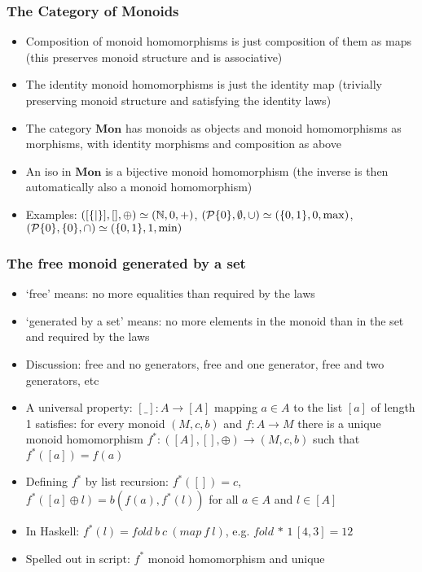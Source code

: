 \documentclass[handout]{beamer}
\newcommand{\bfsf}[1]{{\boldsymbol{#1}}}
\newcommand{\Mon}{\bfsf{Mon}}
\begin{document}
\frame
  {   
    \frametitle{The Category of Monoids}\label{Ch2:CatMon}

 \begin{itemize}[<+->]
\item Composition of monoid homomorphisms is just composition of them as maps
(this preserves monoid structure and is associative)
\item The identity monoid homomorphisms is just the identity map 
(trivially preserving monoid structure and satisfying the identity laws)
\item The category $\Mon$ has monoids as objects and monoid homomorphisms
 as morphisms, with identity morphisms and composition as above
\item An iso in $\Mon$ is a bijective monoid  homomorphism (the inverse
is then automatically also a monoid  homomorphism) 
\item Examples: $([\{|\}],[],\oplus) \simeq (\mathbb{N},0,{+})$, 
$({\operatorname{\mathcal{P}}}{\{0\}},\emptyset,{\cup}) \simeq (\{0,1\},0,{\max})$,
$({\operatorname{\mathcal{P}}}{\{0\}},\{0\},{\cap}) \simeq (\{0,1\},1,{\min})$

 \end{itemize}

 }

\frame
  {   
    \frametitle{The free monoid generated by a set }\label{Ch2:freemonoid}

 \begin{itemize}[<+->]
\item `free' means: no more equalities than required by the laws
\item `generated by a set' means: no more elements in the monoid
 than in the set and required by the laws
\item Discussion: free and no generators, free and one generator, free and two generators, etc
\item A universal property: $[\_] : A \to [A]$ mapping 
$a\in A$ to the list $[a]$ of length 1 satisfies: for every monoid $(M,c,b)$ and $f: A\to M$
there is a unique monoid homomorphism $f^*: ([A],[],{\oplus}) \to (M,c,b)$ 
such that $f^*([a]) = f(a)$ %
\item Defining $f^*$ by list recursion: $f^*([]) = c$, 
$f^*([a]\oplus l) = b(f(a),f^*(l))$ for all $a\in A$ and $l\in[A]$
\item In Haskell: $f^*(l) = fold~b~c~(map~f~l)$, e.g. $fold\,{*}\,1\,[4,3] = 12$
\item Spelled out in script: $f^*$ monoid homomorphism and unique
 \end{itemize}

 }
\end{document}
